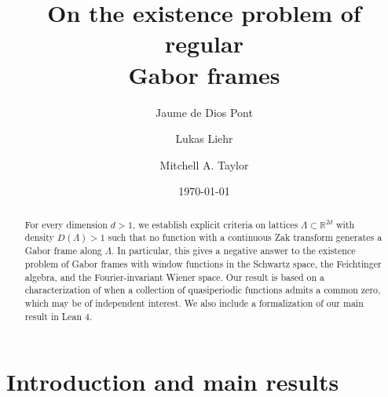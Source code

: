\documentclass[reqno,a4paper,12pt]{amsart}
\numberwithin{equation}{section}
\newcommand\1{\mathds{1}}
\begin{document}
\title[On the existence problem of regular Gabor frames]{On the existence problem of regular \\ Gabor frames}

\author[Jaume de Dios Pont]{Jaume de Dios Pont}
\address{Center for Data Science, New York University, New York, New York 10011, USA}

\author[Lukas Liehr]{Lukas Liehr}
\address{Department of Mathematics, Bar-Ilan University, Ramat-Gan 5290002, Israel}

\author[Mitchell A. Taylor]{Mitchell A. Taylor}
\address{ Department of Mathematics, ETH Z\"urich, Ramistrasse 101, 8092 Z\"urich, Switzerland}



\date{\today}

\begin{abstract}
For every dimension $d > 1$, we establish explicit criteria on lattices $\Lambda \subset \mathbb{R}^{2d}$ with density $D(\Lambda) > 1$ such that no function with a continuous Zak transform generates a Gabor frame along $\Lambda$. In particular, this gives a negative answer to the existence problem of Gabor frames with window functions in the Schwartz space, the Feichtinger algebra, and the Fourier-invariant Wiener space.
Our result is based on a characterization of when a collection of quasiperiodic functions admits a common zero, which may be of independent interest. We also include a formalization of our main result in Lean 4.
\end{abstract}

\maketitle

\section{Introduction and main results}
\end{document}
